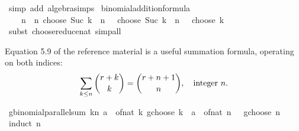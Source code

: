 \begin{isabellebody}
\ {\isacharparenleft}{\kern0pt}simp\ add{\isacharcolon}{\kern0pt}\ algebra{\isacharunderscore}{\kern0pt}simps{\isacharparenright}{\kern0pt}%
\endisatagproof
{\isafoldproof}%
%
\isadelimproof
\isanewline
%
\endisadelimproof
\isanewline
{}\isamarkupfalse%
\ binomial{\isacharunderscore}{\kern0pt}addition{\isacharunderscore}{\kern0pt}formula{\isacharcolon}{\kern0pt}\isanewline
\ \ {\isachardoublequoteopen}{}\ {\isacharless}{\kern0pt}\ n\ {\isasymLongrightarrow}\ n\ choose\ {\isacharparenleft}{\kern0pt}Suc\ k{\isacharparenright}{\kern0pt}\ {\isacharequal}{\kern0pt}\ {\isacharparenleft}{\kern0pt}{\isacharparenleft}{\kern0pt}n\ {\isacharminus}{\kern0pt}\ {}{\isacharparenright}{\kern0pt}\ choose\ {\isacharparenleft}{\kern0pt}Suc\ k{\isacharparenright}{\kern0pt}{\isacharparenright}{\kern0pt}\ {\isacharplus}{\kern0pt}\ {\isacharparenleft}{\kern0pt}{\isacharparenleft}{\kern0pt}n\ {\isacharminus}{\kern0pt}\ {}{\isacharparenright}{\kern0pt}\ choose\ k{\isacharparenright}{\kern0pt}{\isachardoublequoteclose}\isanewline
%
\isadelimproof
\ \ %
\endisadelimproof
%
\isatagproof
{}\isamarkupfalse%
\ {\isacharparenleft}{\kern0pt}subst\ choose{\isacharunderscore}{\kern0pt}reduce{\isacharunderscore}{\kern0pt}nat{\isacharparenright}{\kern0pt}\ simp{\isacharunderscore}{\kern0pt}all%
\endisatagproof
{\isafoldproof}%
%
\isadelimproof
%
\endisadelimproof
%
\begin{isamarkuptext}%
Equation 5.9 of the reference material \cite[p.~159]{GKP_CM} is a useful
  summation formula, operating on both indices:
  \[
   \sum\limits_{k \leq n}{r + k \choose k} = {r + n + 1 \choose n},
   \quad \textnormal{integer } n.
  \]%
\end{isamarkuptext}\isamarkuptrue%
\isamarkupfalse%
\ gbinomial{\isacharunderscore}{\kern0pt}parallel{\isacharunderscore}{\kern0pt}sum{\isacharcolon}{\kern0pt}\ {\isachardoublequoteopen}{\isacharparenleft}{\kern0pt}{\isasymSum}k{\isasymle}n{\isachardot}{\kern0pt}\ {\isacharparenleft}{\kern0pt}a\ {\isacharplus}{\kern0pt}\ of{\isacharunderscore}{\kern0pt}nat\ k{\isacharparenright}{\kern0pt}\ gchoose\ k{\isacharparenright}{\kern0pt}\ {\isacharequal}{\kern0pt}\ {\isacharparenleft}{\kern0pt}a\ {\isacharplus}{\kern0pt}\ of{\isacharunderscore}{\kern0pt}nat\ n\ {\isacharplus}{\kern0pt}\ {}{\isacharparenright}{\kern0pt}\ gchoose\ n{\isachardoublequoteclose}\isanewline
%
\isadelimproof
%
\endisadelimproof
%
\isatagproof
{}\isamarkupfalse%
\ {\isacharparenleft}{\kern0pt}induct\ n{\isacharparenright}{\kern0pt}\isanewline

\end{isabellebody}

